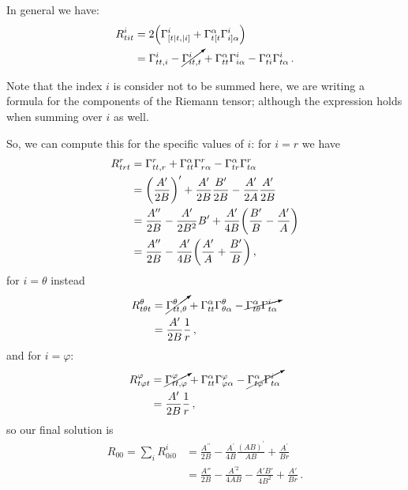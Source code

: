 \documentclass[main.tex]{subfiles}
\begin{document}
In general we have: 
%
\begin{subequations}
\begin{align}
  R^{i}_{tit} &= 2 \qty( \Gamma^{i}_{[t| t, |i]}  + \Gamma^{\alpha }_{t[t} \Gamma^{i}_{i] \alpha })  \\
  &= \Gamma^{i}_{tt, i} - \cancelto{}{\Gamma^{i}_{it,t}}
  + \Gamma^{\alpha }_{tt} \Gamma^{i}_{i\alpha }
  - \Gamma^{\alpha }_{ti} \Gamma^{i}_{t\alpha }
\,.
\end{align}
\end{subequations}

Note that the index \(i\) is consider not to be summed here, we are writing a formula for the components of the Riemann tensor; although the expression holds when summing over \(i\) as well. 

So, we can compute this for the specific values of \(i\): for \(i=r\) we have 
%
\begin{subequations}
\begin{align}
  R^{r}_{trt} &= \Gamma^{r}_{tt, r} + \Gamma^{\alpha}_{tt} 
  \Gamma^{r}_{r \alpha } - \Gamma^{\alpha }_{tr} \Gamma^{r}_{t \alpha }  \\
  &= \qty(\frac{A^{\prime }}{2B})^{\prime } + \frac{A^{\prime }}{2B} \frac{B^{\prime }}{2B} - \frac{A^{\prime }}{2A} \frac{A^{\prime }}{2B}  \\
  &= \frac{A^{\prime \prime}}{2B} - \frac{A^{\prime }}{2B^2} B^{\prime } + \frac{A^{\prime }}{4B} \qty(\frac{B^{\prime }}{B} - \frac{A^{\prime}}{A}) \\ 
  &= \frac{A^{\prime \prime}}{2B} - \frac{A^{\prime }}{4B} \qty(\frac{A^{\prime}}{A} + \frac{B^{\prime }}{B})
  \,,
\end{align}
\end{subequations}
%
for \(i= \theta \) instead 
%
\begin{subequations}
\begin{align}
  R^{\theta }_{t \theta  t} &= \cancelto{}{\Gamma^{\theta}_{tt, \theta}} + \Gamma^{\alpha}_{tt} 
  \Gamma^{\theta}_{\theta \alpha } - \cancelto{}{\Gamma^{\alpha }_{t\theta} \Gamma^{i}_{t \alpha }}  \\
  &= \frac{A^{\prime }}{2B} \frac{1}{r}
  \,,
\end{align}
\end{subequations}
%
and for \(i = \varphi \):  
%
\begin{subequations}
  \begin{align}
    R^{\varphi }_{t \varphi t} &= \cancelto{}{\Gamma^{\varphi}_{tt, \varphi}} + \Gamma^{\alpha}_{tt} 
    \Gamma^{\varphi}_{\varphi \alpha } - \cancelto{}{\Gamma^{\alpha }_{t\varphi} \Gamma^{i}_{t \alpha }}  \\
    &= \frac{A^{\prime }}{2B} \frac{1}{r}
    \,,
  \end{align}
\end{subequations}
%
so our final solution is 
%
\begin{align}
  R_{00} = \sum_i R^{i}_{0i0} &= \frac{A^{\prime \prime}}{2B} 
  - \frac{A^{\prime }}{4B} \frac{(AB)^{\prime }}{AB} + \frac{A^{\prime }}{Br}  \\
  &= \frac{A''}{2B} - \frac{A^{\prime 2} }{4AB} - \frac{A' B' }{4B^2} + \frac{A'}{Br}
\,.
\end{align}
%
\end{document}
